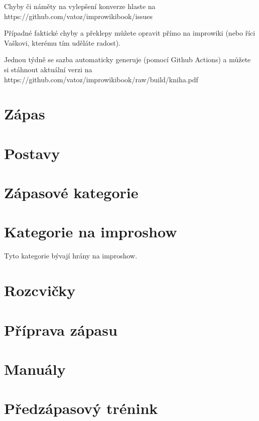\documentclass[a4paper,10pt,openany]{book}
\begin{document}
Chyby či náměty na vylepšení konverze hlaste na https://github.com/vatoz/improwikibook/issues 

Případné faktické chyby a překlepy můžete opravit přímo na improwiki (nebo říci Vaškovi, kterému tím uděláte radost).

Jednou týdně se sazba automaticky generuje (pomocí Github Actions) a můžete si stáhnout aktuální verzi na https://github.com/vatoz/improwikibook/raw/build/kniha.pdf 


\chapter{Zápas}







\chapter{Postavy}



\chapter{Zápasové kategorie}
\label{zápasové kategorie}
\label{:kategorie:zápasové kategorie}



\chapter{Kategorie na improshow}\label{další kategorie}
\label{:kategorie:kategorie na improshow}
Tyto kategorie bývají hrány na improshow.


\chapter{Rozcvičky}\label{rozcvičky}
\label{:kategorie:rozcvičky}





\chapter{Příprava zápasu}


\chapter{Manuály}


\chapter{Předzápasový trénink}

\end{document}
